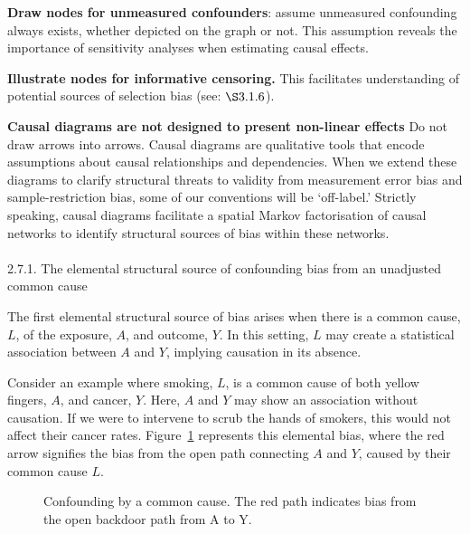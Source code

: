 \documentclass[
  singlecolumn]{article}
\makeatletter
\let\oldparagraph\paragraph
\renewcommand{\paragraph}{
    \@ifstar
      \xxxParagraphStar
      \xxxParagraphNoStar
  }
\newcommand{\xxxParagraphStar}[1]{\oldparagraph*{#1}\mbox{}}
\newcommand{\xxxParagraphNoStar}[1]{\oldparagraph{#1}\mbox{}}
\makeatother
\begin{document}
\textbf{Draw nodes for unmeasured confounders}: assume unmeasured
confounding always exists, whether depicted on the graph or not. This
assumption reveals the importance of sensitivity analyses when
estimating causal effects.

\textbf{Illustrate nodes for informative censoring.} This facilitates
understanding of potential sources of selection bias (see:
\(\S 3.1.6\)).

\textbf{Causal diagrams are not designed to present non-linear effects}
Do not draw arrows into arrows. Causal diagrams are qualitative tools
that encode assumptions about causal relationships and dependencies.
When we extend these diagrams to clarify structural threats to validity
from measurement error bias and sample-restriction bias, some of our
conventions will be `off-label.' Strictly speaking, causal diagrams
facilitate a spatial Markov factorisation of causal networks to identify
structural sources of bias within these networks.

\paragraph{2.7.1. The elemental structural source of confounding bias
from an unadjusted common
cause}\label{the-elemental-structural-source-of-confounding-bias-from-an-unadjusted-common-cause}

The first elemental structural source of bias arises when there is a
common cause, \(L\), of the exposure, \(A\), and outcome, \(Y\). In this
setting, \(L\) may create a statistical association between \(A\) and
\(Y\), implying causation in its absence.

Consider an example where smoking, \(L\), is a common cause of both
yellow fingers, \(A\), and cancer, \(Y\). Here, \(A\) and \(Y\) may show
an association without causation. If we were to intervene to scrub the
hands of smokers, this would not affect their cancer rates.
Figure~\ref{fig-dag-common-cause} represents this elemental bias, where
the red arrow signifies the bias from the open path connecting \(A\) and
\(Y\), caused by their common cause \(L\).

\begin{figure}


\caption{\label{fig-dag-common-cause}Confounding by a common cause. The
red path indicates bias from the open backdoor path from A to Y.}

\end{figure}%
\end{document}
